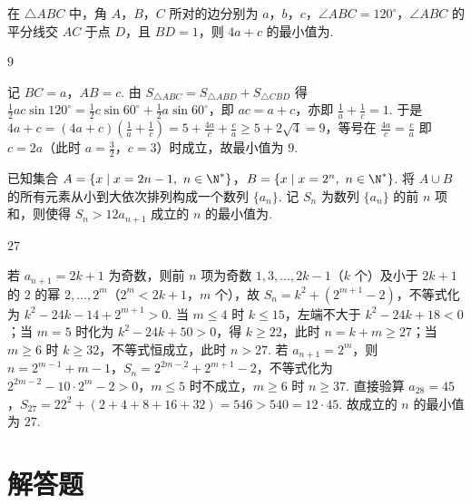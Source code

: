 \begin{problem}
在 \(\triangle ABC\) 中，角 \(A\)，\(B\)，\(C\) 所对的边分别为 \(a\)，\(b\)，\(c\)，\(\angle ABC=120^\circ\)，\(\angle ABC\) 的平分线交 \(AC\) 于点 \(D\)，且 \(BD=1\)，则 \(4a+c\) 的最小值为\fillinblank{}.
\end{problem}

\begin{answer}
\(9\)
\end{answer}

\begin{solution}
记 \(BC=a\)，\(AB=c\). 由 \(S_{\triangle ABC}=S_{\triangle ABD}+S_{\triangle CBD}\) 得 \(\frac12ac\sin120^{\circ}=\frac12c\sin60^{\circ}+\frac12a\sin60^{\circ}\)，即 \(ac=a+c\)，亦即 \(\frac1a+\frac1c=1\). 于是 \(4a+c=(4a+c)\left(\frac1a+\frac1c\right)=5+\frac{4a}{c}+\frac{c}{a}\geqslant5+2\sqrt4=9\)，等号在 \(\frac{4a}{c}=\frac{c}{a}\) 即 \(c=2a\)（此时 \(a=\frac32\)，\(c=3\)）时成立，故最小值为 \(9\).
\end{solution}

\begin{problem}
已知集合 \(A=\{x\mid x=2n-1,\ n\in\N^*\}\)，\(B=\{x\mid x=2^n,\ n\in\N^*\}\). 将 \(A\cup B\) 的所有元素从小到大依次排列构成一个数列 \(\{a_n\}\). 记 \(S_n\) 为数列 \(\{a_n\}\) 的前 \(n\) 项和，则使得 \(S_n>12a_{n+1}\) 成立的 \(n\) 的最小值为\fillinblank{}.
\end{problem}

\begin{answer}
\(27\)
\end{answer}

\begin{solution}
若 \(a_{n+1}=2k+1\) 为奇数，则前 \(n\) 项为奇数 \(1,3,\ldots,2k-1\)（\(k\) 个）及小于 \(2k+1\) 的 \(2\) 的幂 \(2,\ldots,2^m\)（\(2^m<2k+1\)，\(m\) 个），故 \(S_n=k^2+(2^{m+1}-2)\)，不等式化为 \(k^2-24k-14+2^{m+1}>0\). 当 \(m\leqslant4\) 时 \(k\leqslant15\)，左端不大于 \(k^2-24k+18<0\)；当 \(m=5\) 时化为 \(k^2-24k+50>0\)，得 \(k\geqslant22\)，此时 \(n=k+m\geqslant27\)；当 \(m\geqslant6\) 时 \(k\geqslant32\)，不等式恒成立，此时 \(n>27\). 若 \(a_{n+1}=2^m\)，则 \(n=2^{m-1}+m-1\)，\(S_n=2^{2m-2}+2^{m+1}-2\)，不等式化为 \(2^{2m-2}-10\cdot2^m-2>0\)，\(m\leqslant5\) 时不成立，\(m\geqslant6\) 时 \(n\geqslant37\). 直接验算 \(a_{28}=45\)，\(S_{27}=22^2+(2+4+8+16+32)=546>540=12\cdot45\). 故成立的 \(n\) 的最小值为 \(27\).
\end{solution}

\section{解答题}

